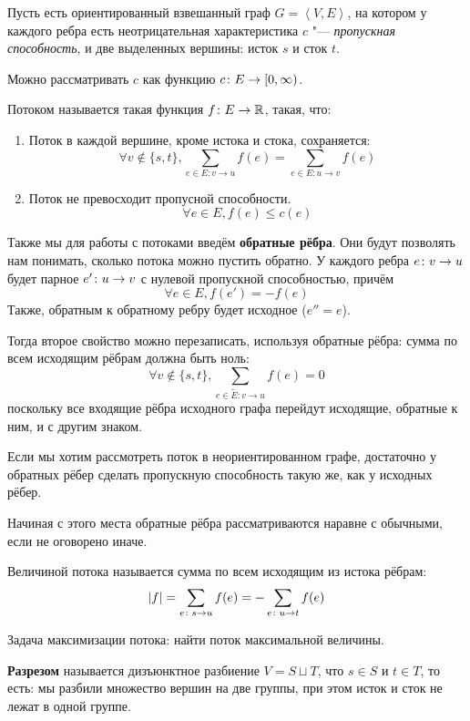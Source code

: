 \begin{Def}
	Пусть есть ориентированный взвешанный граф $G = \left<V, E\right>$,
	на котором у каждого ребра есть неотрицательная характеристика $c$ "--- \textit{пропускная способность},
	и две выделенных вершины: исток $s$ и сток $t$.\
	\begin{Rem}
		Можно рассматривать $c$ как функцию $c\colon E \rightarrow [0, \infty)$.
	\end{Rem}
	Потоком называется такая функция $f\colon E \rightarrow \mathbb{R}$, такая, что:
	\begin{enumerate}
	\item
		Поток в каждой вершине, кроме истока и стока, сохраняется:
		\[ \forall v \notin \{s, t\}, \sum_{e \in E\colon v \to u} f(e) = \sum_{e \in E\colon u \to v} f(e) \]

	\item
		Поток не превосходит пропусной способности.
		\[ \forall e \in E, f(e) \le c(e) \]
	\end{enumerate}

	Также мы для работы с потоками введём \textbf{обратные рёбра}.
	Они будут позволять нам понимать, сколько потока можно пустить обратно.
	У каждого ребра $e\colon v \rightarrow u$ будет парное $e'\colon u \rightarrow v$ с нулевой пропускной способностью, причём
	\[ \forall e \in E, f(e') = -f(e) \]
	Также, обратным к обратному ребру будет исходное ($e'' = e$).

	Тогда второе свойство можно перезаписать, используя обратные рёбра: сумма по всем исходящим рёбрам должна быть ноль:
	\[ \forall v \notin \{s, t\}, \sum_{e\in \tilde E\colon v \to u} f(e) = 0 \]
	поскольку все входящие рёбра исходного графа перейдут исходящие, обратные к ним, и с другим знаком.
\end{Def}
\begin{Rem}
	Если мы хотим рассмотреть поток в неориентированном графе, достаточно у обратных рёбер сделать пропускную способность такую же, как у исходных рёбер.
\end{Rem}
\begin{Rem}
	Начиная с этого места обратные рёбра рассматриваются наравне с обычными, если не оговорено иначе.
\end{Rem}
\begin{Def}
	Величиной потока называется сумма по всем исходящим из истока рёбрам:
	\[ |f| = \sum_{e\colon s \rightarrow u} f(e) = -\sum_{e\colon u \rightarrow t} f(e) \]
\end{Def}

Задача максимизации потока: найти поток максимальной величины.
\begin{Def}
	\textbf{Разрезом} называется дизъюнктное разбиение $V = S \sqcup T$, что $s \in S$ и $t \in T$, то есть:
	мы разбили множество вершин на две группы, при этом исток и сток не лежат в одной группе.
\end{Def}

